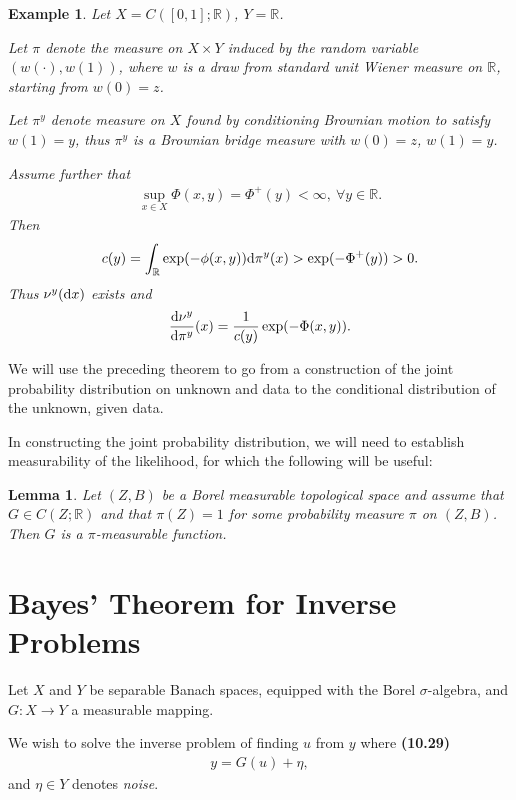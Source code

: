 \documentclass[oneside,11pt]{book}
\numberwithin{equation}{section}
\newtheorem{lemma}{Lemma}[section]
\newtheorem{example}{Example}[section]
\begin{document}
\begin{example}
    Let $X = C([0,1];\mathbb{R})$, $Y = \mathbb{R}$.
    
    Let $\pi$ denote the measure on $X\times Y$ induced by the random variable $(w(\cdot),w(1))$, where $w$ is a draw from standard unit Wiener measure on $\mathbb{R}$, starting from $w(0) = z$.
    
    Let $\pi^y$ denote measure on $X$ found by conditioning Brownian motion to satisfy $w(1) = y$, thus $\pi^y$ is a Brownian bridge measure with $w(0) = z$, $w(1) = y$.
    
    Assume further that
    \begin{align*}
        \sup_{x\in X} \Phi(x,y) = \Phi^+(y) < \infty,\ \forall y\in\mathbb{R}.
    \end{align*} 
    Then
    \begin{align*}
        c(y) = \int_\mathbb{R} \exp(-\phi(x,y)){\rm d}\pi^y(x) > \exp(-\Phi^+(y)) > 0.
    \end{align*}
    Thus $\nu^y({\rm d}x)$ exists and
    \begin{align*}
        \frac{{\rm d}\nu^y}{{\rm d}\pi^y}(x) = \frac{1}{c(y)}\exp(-\Phi(x,y)).
    \end{align*}
\end{example}
We will use the preceding theorem to go from a construction of the joint probability distribution on unknown and data to the conditional distribution of the unknown, given data.

In constructing the joint probability distribution, we will need to establish measurability of the likelihood, for which the following will be useful:

\begin{lemma}
    Let $(Z,B)$ be a Borel measurable topological space and assume that $G\in C(Z;\mathbb{R})$ and that $\pi(Z) = 1$ for some probability measure $\pi$ on $(Z,B)$. Then $G$ is a $\pi$-measurable function.
\end{lemma}

\section{Bayes' Theorem for Inverse Problems}
Let $X$ and $Y$ be separable Banach spaces, equipped with the Borel $\sigma$-algebra, and $G:X\to Y$ a measurable mapping.

We wish to solve the inverse problem of finding $u$ from $y$ where \textbf{(10.29)}
\begin{align*}
    y = G(u) + \eta,
\end{align*}
and $\eta\in Y$ denotes \textit{noise}.
\end{document}
